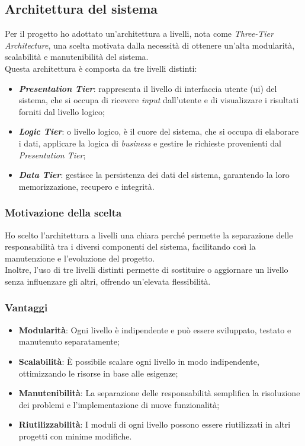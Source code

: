 \subsection{Architettura del sistema}
\label{subsec:architettura}

Per il progetto ho adottato un'architettura a livelli, nota come \textit{Three-Tier Architecture}, una scelta motivata dalla necessità di ottenere un'alta modularità, scalabilità e manutenibilità del sistema.\\

\noindent Questa architettura è composta da tre livelli distinti:

\begin{itemize}
    \item \textbf{\textit{Presentation Tier}}: rappresenta il livello di interfaccia utente (\gls{ui}) del sistema,
    che si occupa di ricevere \textit{input} dall'utente e di visualizzare i risultati forniti dal livello logico;
    
    \item \textbf{\textit{Logic Tier}}: o livello logico, è il cuore del sistema,
    che si occupa di elaborare i dati, applicare la logica di \textit{business} e gestire le richieste provenienti dal \textit{Presentation Tier};
    
    \item \textbf{\textit{Data Tier}}: gestisce la persistenza dei dati del sistema, garantendo la loro memorizzazione, recupero e integrità.
\end{itemize}

\subsubsection{Motivazione della scelta}

\noindent Ho scelto l'architettura a livelli una chiara perché permette la separazione delle responsabilità tra i diversi componenti del sistema, facilitando così la manutenzione e l'evoluzione del progetto.\\
Inoltre, l'uso di tre livelli distinti permette di sostituire o aggiornare un livello senza influenzare gli altri, offrendo un'elevata flessibilità.

\subsubsection{Vantaggi}
\begin{itemize}
    \item \textbf{Modularità}: Ogni livello è indipendente e può essere sviluppato, testato e manutenuto separatamente;
    \item \textbf{Scalabilità}: È possibile scalare ogni livello in modo indipendente, ottimizzando le risorse in base alle esigenze;
    \item \textbf{Manutenibilità}: La separazione delle responsabilità semplifica la risoluzione dei problemi e l'implementazione di nuove funzionalità;
    \item \textbf{Riutilizzabilità}: I moduli di ogni livello possono essere riutilizzati in altri progetti con minime modifiche.
\end{itemize}

